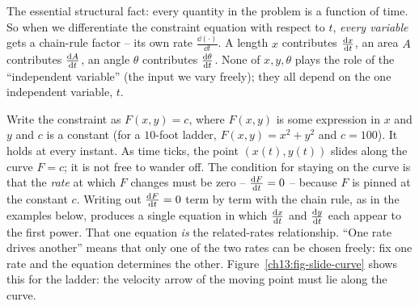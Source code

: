 The essential structural fact: every quantity in the problem is a function of time. So when we
differentiate the constraint equation with respect to $t$, \emph{every variable} gets a chain-rule
factor -- its own rate $\frac{\dd(\cdot)}{\dd t}$. A length $x$ contributes $\frac{\mathrm{d} x}{\mathrm{d} t}$, an area $A$
contributes $\frac{\mathrm{d} A}{\mathrm{d} t}$, an angle $\theta$ contributes $\frac{\mathrm{d} \theta}{\mathrm{d} t}$. None of $x,y,\theta$ plays the
role of the ``independent variable'' (the input we vary freely); they all depend on the one
independent variable, $t$.

\begin{happeningbox}
Write the constraint as $F(x,y) = c$, where $F(x,y)$ is some expression in $x$ and $y$ and $c$ is a
constant (for a $10$-foot ladder, $F(x,y) = x^2+y^2$ and $c = 100$). It holds at every instant. As time
ticks, the point $(x(t), y(t))$ slides along the curve $F=c$; it is not free to wander off. The
condition for staying on the curve is that the \emph{rate} at which $F$ changes must be zero --
$\frac{\mathrm{d} F}{\mathrm{d} t} = 0$ -- because $F$ is pinned at the constant $c$. Writing out $\frac{\mathrm{d} F}{\mathrm{d} t}=0$ term by term
with the chain rule, as in the examples below, produces a single equation in which $\frac{\mathrm{d} x}{\mathrm{d} t}$ and
$\frac{\mathrm{d} y}{\mathrm{d} t}$ each appear to the first power. That one equation
\emph{is} the related-rates relationship. ``One rate drives another'' means that only one of the two
rates can be chosen freely: fix one rate and the equation determines the other.
Figure~\ref{ch13:fig-slide-curve} shows this for the ladder: the velocity arrow of the moving point
must lie along the curve.
\end{happeningbox}

